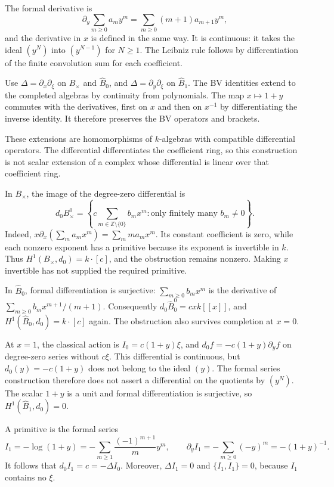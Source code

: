 The formal derivative is
\[
 \partial_y\sum_{m\geq0}a_m y^m
 =\sum_{m\geq0}(m+1)a_{m+1}y^m,
\]
and the derivative in $x$ is defined in the same way.
It is continuous: it takes the ideal $(y^N)$ into $(y^{N-1})$ for
$N\geq1$. The Leibniz rule follows by differentiation of the finite
convolution sum for each coefficient.

Use $\Delta=\partial_x\partial_\xi$ on $B_\times$ and
$\widehat B_0$, and $\Delta=\partial_y\partial_\xi$ on
$\widehat B_1$.
The BV identities extend to the completed algebras by continuity from
polynomials. The map $x\mapsto1+y$ commutes with the derivatives,
first on $x$ and then on $x^{-1}$ by differentiating the inverse identity.
It therefore preserves the BV operators and brackets.

These extensions are homomorphisms of $k$-algebras with compatible
differential operators. The differential differentiates the coefficient
ring, so this construction is not scalar extension of a complex whose
differential is linear over that coefficient ring.

In $B_\times$, the image of the degree-zero differential is
\[
 d_0B_\times^0
 =\left\{c\sum_{m\in\mathbb Z\setminus\{0\}}b_m x^m:
                  \text{only finitely many }b_m\ne0\right\}.
\]
Indeed, $x\partial_x(\sum_m a_mx^m)=\sum_m m a_mx^m$.
Its constant coefficient is zero, while each nonzero exponent has a
primitive because its exponent is invertible in $k$.
Thus $H^1(B_\times,d_0)=k\cdot[c]$, and the obstruction remains nonzero.
Making $x$ invertible has not supplied the required primitive.

In $\widehat B_0$, formal differentiation is surjective:
$\sum_{m\geq0}b_mx^m$ is the derivative of
$\sum_{m\geq0}b_mx^{m+1}/(m+1)$.
Consequently $d_0\widehat B_0^0=cx k[[x]]$, and
$H^1(\widehat B_0,d_0)=k\cdot[c]$ again.
The obstruction also survives completion at $x=0$.

At $x=1$, the classical action is $I_0=c(1+y)\xi$, and
$d_0f=-c(1+y)\partial_y f$ on degree-zero series without $c\xi$.
This differential is continuous, but $d_0(y)=-c(1+y)$ does not belong
to the ideal $(y)$. The formal series construction therefore does not
assert a differential on the quotients by $(y^N)$.
The scalar $1+y$ is a unit and formal differentiation is surjective,
so $H^1(\widehat B_1,d_0)=0$.

A primitive is the formal series
\[
 I_1=-\log(1+y)
     =-\sum_{m\geq1}\frac{(-1)^{m+1}}m y^m,
 \qquad \partial_y I_1=-\sum_{m\geq0}(-y)^m=-(1+y)^{-1}.
\]
It follows that $d_0I_1=c=-\Delta I_0$.
Moreover, $\Delta I_1=0$ and $\{I_1,I_1\}=0$, because $I_1$
contains no $\xi$.


